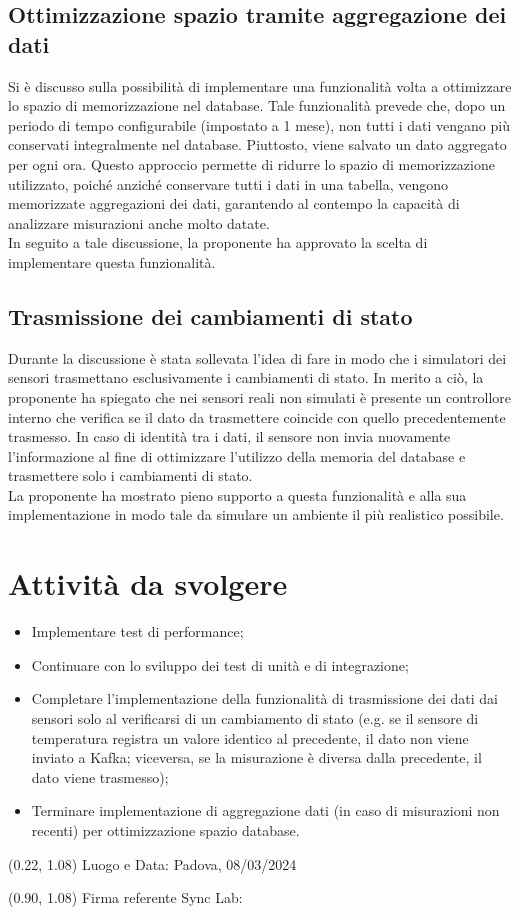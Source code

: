 \documentclass{article}
\begin{document}
    \subsection{Ottimizzazione spazio tramite aggregazione dei dati}
        Si è discusso sulla possibilità di implementare una funzionalità volta a ottimizzare lo spazio di memorizzazione nel database. Tale funzionalità prevede che, dopo un periodo di tempo configurabile (impostato a 1 mese), non tutti i dati vengano più conservati integralmente nel database. Piuttosto, viene salvato un dato aggregato per ogni ora. Questo approccio permette di ridurre lo spazio di memorizzazione utilizzato, poiché anziché conservare tutti i dati in una tabella, vengono memorizzate aggregazioni dei dati, garantendo al contempo la capacità di analizzare misurazioni anche molto datate. \\
        In seguito a tale discussione, la proponente ha approvato la scelta di implementare questa funzionalità.

    \subsection{Trasmissione dei cambiamenti di stato}
        Durante la discussione è stata sollevata l'idea di fare in modo che i simulatori dei sensori trasmettano esclusivamente i cambiamenti di stato. In merito a ciò, la proponente ha spiegato che nei sensori reali non simulati è presente un controllore interno che verifica se il dato da trasmettere coincide con quello precedentemente trasmesso. In caso di identità tra i dati, il sensore non invia nuovamente l'informazione al fine di ottimizzare l'utilizzo della memoria del database e trasmettere solo i cambiamenti di stato. \\
        La proponente ha mostrato pieno supporto a questa funzionalità e alla sua implementazione in modo tale da simulare un ambiente il più realistico possibile.

\section{Attività da svolgere}
    \begin{itemize}
        \item Implementare test di performance;
        \item Continuare con lo sviluppo dei test di unità e di integrazione;
        \item Completare l'implementazione della funzionalità di trasmissione dei dati dai sensori solo al verificarsi di un cambiamento di stato (e.g. se il sensore di temperatura registra un valore identico al precedente, il dato non viene inviato a Kafka; viceversa, se la misurazione è diversa dalla precedente, il dato viene trasmesso);
        \item Terminare implementazione di aggregazione dati (in caso di misurazioni non recenti) per ottimizzazione spazio database.
\end{itemize}
\begin{textblock*}{\textwidth}(0.22\textwidth, 1.08\textheight)
    Luogo e Data: Padova, 08/03/2024
\end{textblock*}

\begin{textblock*}{\textwidth}(0.90\textwidth, 1.08\textheight)
        Firma referente Sync Lab:
\end{textblock*}
\end{document}
